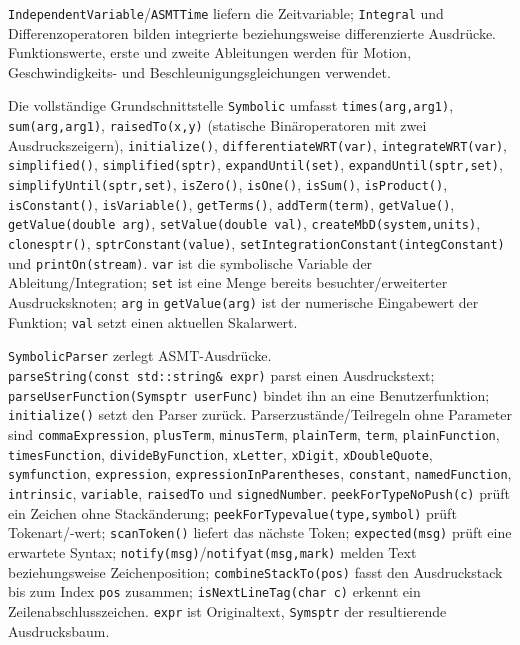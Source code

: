 \documentclass[
  12pt
]{book}
\begin{document}
\texttt{IndependentVariable}/\texttt{ASMTTime} liefern die Zeitvariable;
\texttt{Integral} und Differenzoperatoren bilden integrierte
beziehungsweise differenzierte Ausdrücke. Funktionswerte, erste und
zweite Ableitungen werden für Motion, Geschwindigkeits- und
Beschleunigungsgleichungen verwendet.

Die vollständige Grundschnittstelle \texttt{Symbolic} umfasst
\texttt{times(arg,arg1)}, \texttt{sum(arg,arg1)}, \texttt{raisedTo(x,y)}
(statische Binäroperatoren mit zwei Ausdruckszeigern),
\texttt{initialize()}, \texttt{differentiateWRT(var)},
\texttt{integrateWRT(var)}, \texttt{simplified()},
\texttt{simplified(sptr)}, \texttt{expandUntil(set)},
\texttt{expandUntil(sptr,set)}, \texttt{simplifyUntil(sptr,set)},
\texttt{isZero()}, \texttt{isOne()}, \texttt{isSum()},
\texttt{isProduct()}, \texttt{isConstant()}, \texttt{isVariable()},
\texttt{getTerms()}, \texttt{addTerm(term)}, \texttt{getValue()},
\texttt{getValue(double\ arg)}, \texttt{setValue(double\ val)},
\texttt{createMbD(system,units)}, \texttt{clonesptr()},
\texttt{sptrConstant(value)},
\texttt{setIntegrationConstant(integConstant)} und
\texttt{printOn(stream)}. \texttt{var} ist die symbolische Variable der
Ableitung/Integration; \texttt{set} ist eine Menge bereits
besuchter/erweiterter Ausdrucksknoten; \texttt{arg} in
\texttt{getValue(arg)} ist der numerische Eingabewert der Funktion;
\texttt{val} setzt einen aktuellen Skalarwert.

\texttt{SymbolicParser} zerlegt ASMT-Ausdrücke.
\texttt{parseString(const\ std::string\&\ expr)} parst einen
Ausdruckstext; \texttt{parseUserFunction(Symsptr\ userFunc)} bindet ihn
an eine Benutzerfunktion; \texttt{initialize()} setzt den Parser zurück.
Parserzustände/Teilregeln ohne Parameter sind \texttt{commaExpression},
\texttt{plusTerm}, \texttt{minusTerm}, \texttt{plainTerm},
\texttt{term}, \texttt{plainFunction}, \texttt{timesFunction},
\texttt{divideByFunction}, \texttt{xLetter}, \texttt{xDigit},
\texttt{xDoubleQuote}, \texttt{symfunction}, \texttt{expression},
\texttt{expressionInParentheses}, \texttt{constant},
\texttt{namedFunction}, \texttt{intrinsic}, \texttt{variable},
\texttt{raisedTo} und \texttt{signedNumber}.
\texttt{peekForTypeNoPush(c)} prüft ein Zeichen ohne Stackänderung;
\texttt{peekForTypevalue(type,symbol)} prüft Tokenart/-wert;
\texttt{scanToken()} liefert das nächste Token; \texttt{expected(msg)}
prüft eine erwartete Syntax;
\texttt{notify(msg)}/\texttt{notifyat(msg,mark)} melden Text
beziehungsweise Zeichenposition; \texttt{combineStackTo(pos)} fasst den
Ausdruckstack bis zum Index \texttt{pos} zusammen;
\texttt{isNextLineTag(char\ c)} erkennt ein Zeilenabschlusszeichen.
\texttt{expr} ist Originaltext, \texttt{Symsptr} der resultierende
Ausdrucksbaum.
\end{document}
